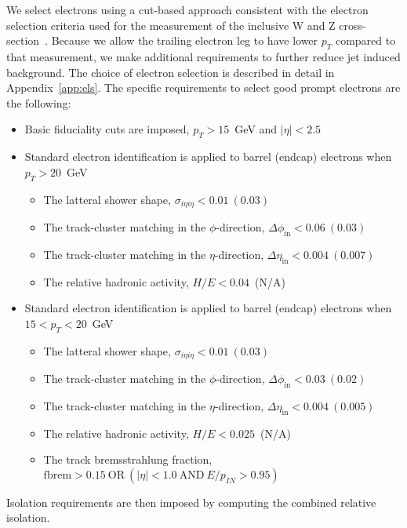 We select electrons using a cut-based approach consistent with the electron 
selection criteria used for the measurement of the inclusive W and Z 
cross-section~\cite{VBTFCrossSectionNote}. 
Because we allow the trailing electron leg to have lower $p_T$ compared
to that measurement, we make additional requirements to further reduce
jet induced background.
The choice of electron selection is described in detail in Appendix~\ref{app:els}.
The specific requirements to select good prompt electrons are the following:

\begin{itemize}
    \item Basic fiduciality cuts are imposed,  $p_T>15$~GeV and $|\eta| < 2.5$
    \item Standard electron identification is applied to barrel (endcap) electrons when $p_T>20$~GeV
    \begin{itemize}
        \item The latteral shower shape, $\sigma_{i\eta i\eta} < 0.01~(0.03)$
        \item The track-cluster matching in the $\phi$-direction, $\Delta \phi_{\mathrm{in}} < 0.06~(0.03)$
        \item The track-cluster matching in the $\eta$-direction, $\Delta \eta_{\mathrm{in}} < 0.004~(0.007)$
        \item The relative hadronic activity, $H/E<0.04$~(N/A)
    \end{itemize}
    \item Standard electron identification is applied to barrel (endcap) electrons when $15<p_T<20$~GeV
    \begin{itemize}
        \item The latteral shower shape, $\sigma_{i\eta i\eta} < 0.01~(0.03)$
        \item The track-cluster matching in the $\phi$-direction, $\Delta \phi_{\mathrm{in}} < 0.03~(0.02)$
        \item The track-cluster matching in the $\eta$-direction, $\Delta \eta_{\mathrm{in}} < 0.004~(0.005)$
        \item The relative hadronic activity, $H/E<0.025$~(N/A)
        \item The track bremsstrahlung fraction, $\mathrm{fbrem}>0.15~\mathrm{OR}~(|\eta|<1.0~\mathrm{AND}~E/p_{IN}>0.95)$
    \end{itemize}
\end{itemize}

Isolation requirements are then imposed by computing the combined relative isolation.

